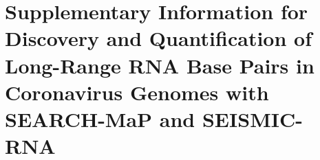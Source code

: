 \documentclass[../MainTexts/main.tex]{subfiles}
\begin{document}
\part*{Supplementary Information for Discovery and Quantification of Long-Range RNA Base Pairs in Coronavirus Genomes with SEARCH-MaP and SEISMIC-RNA}
\label{si}

\newpage

\newpage

\newpage

\end{document}
